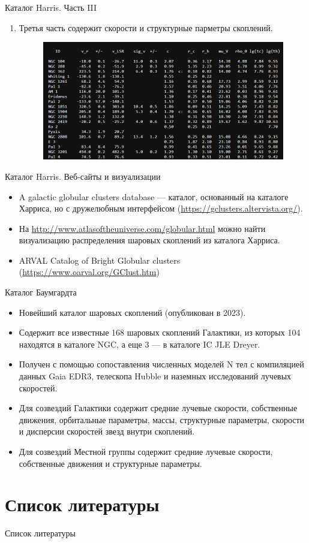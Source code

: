 \documentclass{beamer}
\begin{document}
    \begin{frame}{Каталог Harris. Часть III}
        \begin{enumerate}[]
            \item Третья часть содержит скорости и структурные парметры скоплений.
            \begin{figure}[h]
                \centering
                \includegraphics[width=0.8\linewidth]{pictures/HarrisIII.jpg}
            \end{figure}
        \end{enumerate}
    \end{frame}
    \begin{frame}{Каталог Harris. Веб-сайты и визуализации}
        \begin{itemize}
            \item A galactic globular clusters database --- каталог, основанный на каталоге Харриса, но с дружелюбным интерфейсом (\url{https://gclusters.altervista.org/}).
            \item На \url{http://www.atlasoftheuniverse.com/globular.html} можно найти визуализацию распределения шаровых скоплений из каталога Харриса.
            \item ARVAL Catalog of Bright Globular clusters (\url{https://www.oarval.org/GClust.htm})
        \end{itemize}
    \end{frame}
    \begin{frame}{Каталог Баумгардта}
        \begin{itemize}
            \item Новейший каталог шаровых скоплений (опубликован в 2023)\cite{Baumgardt2023}.
            \item Содержит все известные 168 шаровых скоплений Галактики, из которых 104 находятся в каталоге NGC, а еще 3 — в каталоге IC JLE Dreyer.
            \item Получен с помощью сопоставления численных моделей N тел с компиляцией данных Gaia EDR3, 
                телескопа Hubble и наземных исследований лучевых скоростей.
            \item Для созвездий Галактики содержит средние лучевые скорости, собственные движения, орбитальные параметры, массы, структурные параметры,
                скорости и дисперсии скоростей звезд внутри скоплений.
            \item Для созвездий Местной группы содержит средние лучевые скорости, собственные движения и структурные параметры.
        \end{itemize}
    \end{frame}
    \section{Список литературы}
    \begin{frame}[t, allowframebreaks]{Список литературы}
        
        
    \end{frame}
\end{document}
